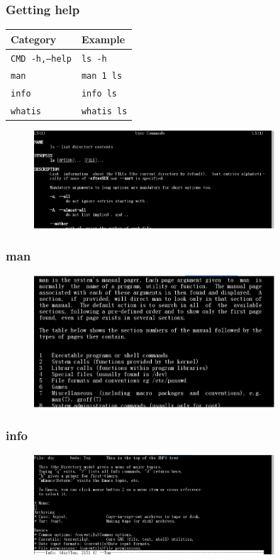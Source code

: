 \documentclass[red]{beamer}
\begin{document}
\begin{CJK*}{UTF8}{gbsn}
\begin{frame}
\frametitle{Getting help}
\begin{table}[ht]
\scriptsize
\renewcommand\arraystretch{1.6}
\begin{tabular}{ll}
\hline
\textbf{Category} & \textbf{Example}\\
\hline
\texttt{CMD -h,--help} & \texttt{ls -h}\\
\texttt{man} & \texttt{man 1 ls}\\
\texttt{info} & \texttt{info ls}\\
\texttt{whatis} & \texttt{whatis ls}\\
\hline
\end{tabular}
\end{table}
\begin{figure}[ht]
\includegraphics[width=0.80\textwidth]{images/ls.png}
\end{figure}
\end{frame}


\begin{frame}
\frametitle{man}
\begin{figure}
\includegraphics[width=0.80\textwidth]{images/man.png}
\end{figure}
\end{frame}


\begin{frame}
\frametitle{info}
\begin{figure}
\includegraphics[width=0.80\textwidth]{images/info.png}
\end{figure}
\end{frame}


\end{CJK*}
\end{document}

